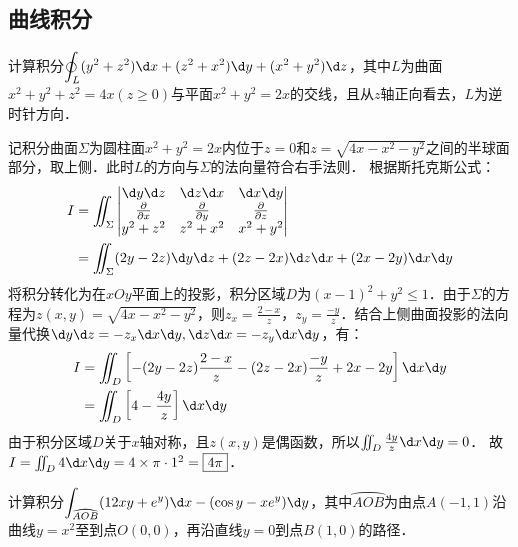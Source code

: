 \documentclass[12pt, a4paper, oneside, UTF8]{ctexbook}
\begin{document}
\subsection{曲线积分}
\begin{exercise}
    计算积分$\displaystyle\oint_L (y^2+z^2)\d x+(z^2+x^2)\d y+(x^2+y^2)\d z$，其中$L$为曲面$x^2+y^2+z^2=4x(z\ge 0)$与平面$x^2+y^2=2x$的交线，且从$z$轴正向看去，$L$为逆时针方向．
\end{exercise}
\begin{solution}
    记积分曲面$\Sigma$为圆柱面$x^2+y^2=2x$内位于$z=0$和$z = \sqrt{4x-x^2-y^2}$之间的半球面部分，取上侧．此时$L$的方向与$\Sigma$的法向量符合右手法则．
    根据斯托克斯公式：
    \begin{align*}
        I &= \iint_\Sigma \begin{vmatrix} \d y\d z & \d z\d x & \d x\d y \\ \frac{\partial}{\partial x} & \frac{\partial}{\partial y} & \frac{\partial}{\partial z} \\ y^2+z^2 & z^2+x^2 & x^2+y^2 \end{vmatrix} \\
        &= \iint_\Sigma (2y-2z)\d y\d z + (2z-2x)\d z\d x + (2x-2y)\d x\d y
    \end{align*}
    将积分转化为在$xOy$平面上的投影，积分区域$D$为$(x-1)^2+y^2 \le 1$．由于$\Sigma$的方程为$z(x,y)=\sqrt{4x-x^2-y^2}$，则$z_x = \frac{2-x}{z}$，$z_y = \frac{-y}{z}$．结合上侧曲面投影的法向量代换$\d y\d z = -z_x \d x\d y, \d z\d x = -z_y \d x\d y$，有：
    \begin{align*}
        I &= \iint_D \left[-(2y-2z)\frac{2-x}{z} - (2z-2x)\frac{-y}{z} + 2x-2y\right]\d x\d y \\
        &= \iint_D \left[ 4 - \frac{4y}{z} \right] \d x\d y
    \end{align*}
    由于积分区域$D$关于$x$轴对称，且$z(x,y)$是偶函数，所以$\iint_D \frac{4y}{z} \d x\d y = 0$．
    故 $I = \iint_D 4 \d x\d y = 4 \times \pi \cdot 1^2 = \boxed{4\pi}$．
\end{solution}
\begin{exercise}
    计算积分$\displaystyle\int_{\wideparen{AOB}}(12xy+e^y)\d x-(\cos y-xe^y)\d y$，其中$\wideparen{AOB}$为由点$A(-1,1)$沿曲线$y=x^2$至到点$O(0,0)$，再沿直线$y=0$到点$B(1,0)$的路径．
\end{exercise}
\end{document}
